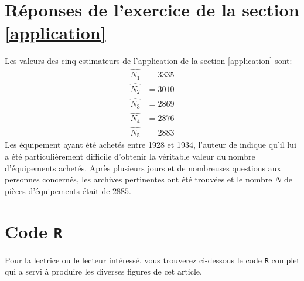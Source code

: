 \documentclass[10pt]{article}
\begin{document}
\hypertarget{reponses-de-lexercice-de-la-section}{%
\section{\texorpdfstring{Réponses de l'exercice de la section
\ref{application}
\label{rep-application}}{Réponses de l'exercice de la section  }}\label{reponses-de-lexercice-de-la-section}}

Les valeurs des cinq estimateurs de l'application de la section
\ref{application} sont: \begin{align*}
\widehat{N_1} &= 3335 \\
\widehat{N_2} &= 3010 \\
\widehat{N_3} &= 2869 \\
\widehat{N_4} &= 2876 \\
\widehat{N_5} &= 2883
\end{align*} Les équipement ayant été achetés entre 1928 et 1934,
l'auteur de \cite{Goodman1954} indique qu'il lui a été particulièrement
difficile d'obtenir la véritable valeur du nombre d'équipements achetés.
Après plusieurs jours et de nombreuses questions aux personnes
concernés, les archives pertinentes ont été trouvées et le nombre \(N\)
de pièces d'équipements était de \(2885\).

\hypertarget{code-r}{%
\section{\texorpdfstring{Code \texttt{R}
\label{code}}{Code R }}\label{code-r}}

Pour la lectrice ou le lecteur intéressé, vous trouverez ci-dessous le
code \texttt{R} complet qui a servi à produire les diverses figures de
cet article.
\end{document}

